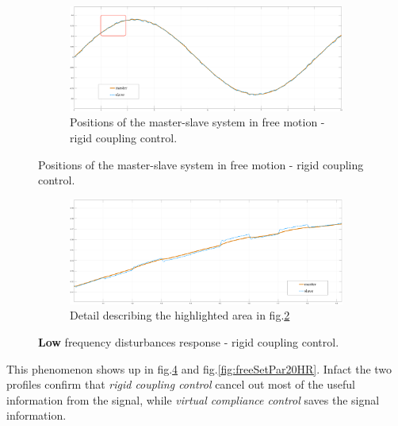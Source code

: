 \begin{figure}[h]
	\begin{subfigure}{1\linewidth}
		\centering
		\includegraphics[width=\textwidth, height=0.48\textwidth]{Images/freerigidTot20HtznoiseRect}
		\caption{Positions of the master-slave system in free motion - rigid coupling control.}
		\label{fig:freeRigTot20HR}
	\end{subfigure}	
\end{figure}
\begin{figure}[h]\ContinuedFloat
	\begin{subfigure}{1\linewidth}
		\centering
		\includegraphics[width=\textwidth, height=0.48\textwidth]{Images/freerigidPart20Htznoise}
		\caption{Detail describing the highlighted area in fig.\ref{fig:freeRigTot20HR}}
		\label{fig:freeRigPar20HR}
	\end{subfigure}	
 \caption{\textbf{Low} frequency disturbances response - rigid coupling control.}
\end{figure}

This phenomenon shows up in fig.\ref{fig:freeRigPar20HR} and fig.\ref{fig:freeSetPar20HR}. Infact the two profiles confirm that \textsl{rigid coupling control} cancel out most of the useful information from the signal, while \textsl{virtual compliance control} saves the signal information.


